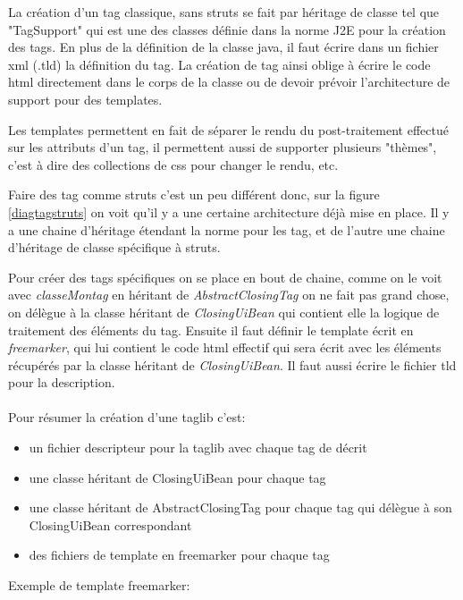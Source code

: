 La création d'un tag classique, sans struts se fait par héritage de classe 
tel que "TagSupport" qui est une des classes définie dans la norme J2E pour la 
création des tags. En plus de la définition de la classe java, il faut écrire
dans un fichier xml (.tld) la définition du tag. La création de tag ainsi oblige
à écrire le code html directement dans le corps de la classe ou de devoir prévoir
l'architecture de support pour des templates.

Les templates permettent en fait de séparer le rendu du post-traitement effectué
sur les attributs d'un tag, il permettent aussi de supporter plusieurs "thèmes", 
c'est à dire des collections de css pour changer le rendu, etc.

Faire des tag comme struts c'est un peu différent donc, sur la figure \ref{diagtagstruts} 
on voit qu'il y a une certaine architecture déjà mise en place. Il y a une chaine 
d'héritage étendant la norme pour les tag, et de l'autre une chaine d'héritage 
de classe spécifique à struts. 

Pour créer des tags spécifiques on se place en bout de chaine, comme on le voit 
avec \emph{classeMontag} en héritant de \emph{AbstractClosingTag} on ne fait pas
grand chose, on délègue à la classe héritant de \emph{ClosingUiBean} qui contient 
elle la logique de traitement des éléments du tag. Ensuite il faut définir le
template écrit en \emph{freemarker}, qui lui contient le code html effectif 
qui sera écrit avec les éléments récupérés par la classe héritant de \emph{ClosingUiBean}.
Il faut aussi écrire le fichier tld pour la description.\\
\\
Pour résumer la création d'une taglib c'est:

\begin{itemize}
\item un fichier descripteur pour la taglib avec chaque tag de décrit 
\item une classe héritant de ClosingUiBean pour chaque tag
\item une classe héritant de AbstractClosingTag pour chaque tag qui délègue à son ClosingUiBean correspondant
\item des fichiers de template en freemarker pour chaque tag
\end{itemize}

Exemple de template freemarker:

